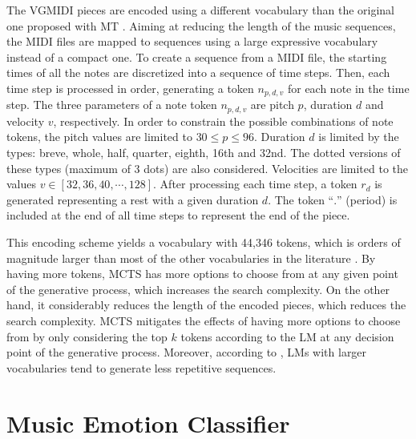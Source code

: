 The VGMIDI pieces are encoded using a different vocabulary than the original one proposed with MT \cite{huang2018music}. Aiming at reducing the length of the music sequences, the MIDI files are mapped to sequences using a large expressive vocabulary instead of a compact one. To create a sequence from a MIDI file, the starting times of all the notes are discretized into a sequence of time steps. Then, each time step is processed in order, generating a token $n_{p, d, v}$ for each note in the time step. The three parameters of a note token $n_{p, d, v}$ are pitch $p$, duration $d$ and velocity $v$, respectively. In order to constrain the possible combinations of note tokens, the pitch values are limited to $30 \leq p \leq 96$. Duration $d$ is limited by the types: breve, whole, half, quarter, eighth, 16th and 32nd. The dotted versions of these types (maximum of 3 dots) are also considered. Velocities are limited to the values $v \in [32, 36, 40, \cdots, 128]$. After processing each time step, a token $r_d$ is generated representing a rest with a given duration $d$. The token ``$.$'' (period) is included at the end of all time steps to represent the end of the piece.

This encoding scheme yields a vocabulary with 44,346 tokens, which is orders of magnitude larger than most of the other vocabularies in the literature \cite{briot2017deep}. By having more tokens, MCTS has more options to choose from at any given point of the generative process, which increases the search complexity. On the other hand, it considerably reduces the length of the encoded pieces, which reduces the search complexity. MCTS mitigates the effects of having more options to choose from by only considering the top $k$ tokens according to the LM at any decision point of the generative process. Moreover, according to \citet{holtzman2018learning}, LMs with larger vocabularies tend to generate less repetitive sequences.


\section{Music Emotion Classifier}
\label{sec:emotion_classifier}

